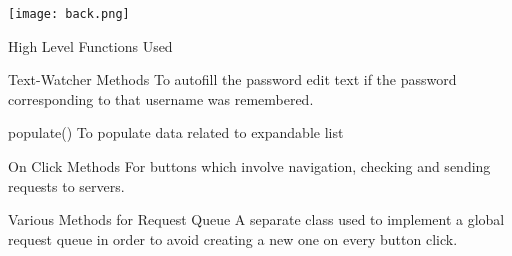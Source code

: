 \documentclass{beamer}
\begin{document}
{\usebackgroundtemplate%
{\texttt{[image: back.png]}}

\begin{frame}{High Level Functions Used }
\begin{block}{Text-Watcher Methods}
To autofill the password edit text if the password corresponding to that username was remembered.
\end{block}
\begin{block}{populate()}
To populate data related to expandable list 
\end{block}
\begin{block}{On Click Methods}
For buttons which involve navigation, checking and sending requests to servers.
\end{block}
\begin{block}{Various Methods for Request Queue}
A separate class used to implement a global request queue in order to avoid creating a new one on every button click.
\end{block}


\end{frame}
}
\end{document}
